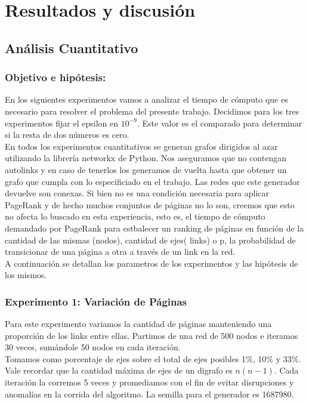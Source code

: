 \section{Resultados y discusión}

\subsection{Análisis Cuantitativo}

\subsubsection{Objetivo e hipótesis:}

En los siguientes experimentos vamos a analizar el tiempo de cómputo que es necesario para resolver el problema del presente trabajo. Decidimos para los tres experimentos fijar el epsilon en $10^{-9}$. Este valor es el comparado para determinar si la resta de dos números es cero. \\

En todos los experimentos cuantitativos se generan grafos dirigidos al azar utilizando la librería networkx \cite{networkx} de Python. Nos aseguramos que no contengan autolinks y en caso de tenerlos los generamos de vuelta hasta que obtener un grafo que cumpla con lo especificiado en el trabajo. Las redes que este generador devuelve son conexas. 
Si bien no es una condición necesaria para aplicar PageRank y de hecho muchos conjuntos de páginas no lo son, creemos que esto no afecta lo buscado en esta experiencia, esto es, el tiempo de cómputo demandado por PageRank para estbalecer un ranking de páginas en función de la cantidad de las mismas (nodos), cantidad de ejes( links) o p, la probabilidad de transicionar de una página a otra a través de un link en la red.\\

A continuación se detallan los parametros de los experimentos y las hipótesis de los mismos. \\

\subsubsection{Experimento 1: Variación de Páginas}
Para este experimento variamos la cantidad de páginas manteniendo una proporción de los links entre ellas. 
Partimos de una red de 500 nodos e iteramos 30 veces, sumándole 50 nodos en cada iteración. \\
Tomamos como porcentaje de ejes sobre el total de ejes posibles 1$\%$, 10$\%$ y 33$\%$. Vale recordar que la cantidad máxima de ejes de un digrafo es $n(n-1)$. Cada iteración la corremos 5 veces y promediamos con el fin de evitar disrupciones y anomalías en la corrida del algoritmo. La semilla para el generador es 1687980. \\
 
